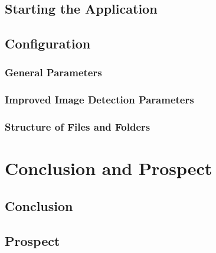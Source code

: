 \documentclass[a4paper, 11pt]{article}
\begin{document}
\subsection{Starting the Application}

\subsection{Configuration}
\subsubsection{General Parameters}
\subsubsection{Improved Image Detection Parameters}
\subsubsection{Structure of Files and Folders}

\newpage
\section{Conclusion and Prospect}
 
\subsection{Conclusion}

\subsection{Prospect}


\newpage
{}

\end{document}
